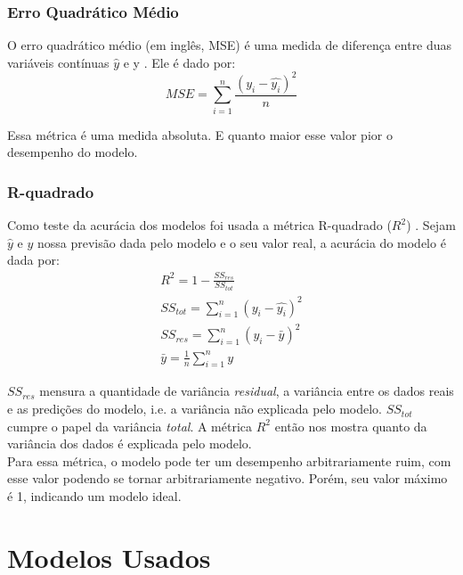 \subsubsection{Erro Quadrático Médio}
\label{sec:MSE}
O erro quadrático médio (em inglês, MSE) é uma medida de diferença entre duas variáveis contínuas
$\hat{y}$ e y \citep{cohen}. Ele é dado por: \\

\[MSE = \sum^n_{i=1}\frac{(y_i - \hat{y_i})^2}{n}\]

Essa métrica é uma medida absoluta. E quanto maior esse valor pior o desempenho
do modelo. \\

\subsubsection{R-quadrado}
Como teste da acurácia dos modelos foi usada a métrica R-quadrado ($R^2$) \citep{cohen}. Sejam $\hat{y}$ e $y$ nossa previsão dada pelo modelo e o seu valor real, a acurácia do modelo é dada por:\\

\begin{align}
&R^2 = 1 - \frac{SS_{res}}{SS_{tot}} &\\
&SS_{tot} = \sum^n_{i=1} (y_i- \hat{y_i})^2 &\\
&SS_{res} = \sum^n_{i=1} (y_i - \bar{y})^2 &\\
&\bar{y} = \frac{1}{n} \sum^n_{i=1} y &
\end{align}

$SS_{res}$ mensura a quantidade de variância \textit{residual}, a
variância entre os dados reais e as predições do modelo, i.e. a variância não
explicada pelo modelo. $SS_{tot}$ cumpre o papel da variância \textit{total}. A métrica $R^2$
então nos mostra quanto da variância dos dados é explicada pelo modelo. \\

Para essa métrica, o modelo pode ter um desempenho arbitrariamente ruim, com esse valor
podendo se tornar arbitrariamente negativo. Porém, seu valor máximo é 1,
indicando um modelo ideal.\\







\section{Modelos Usados} 

